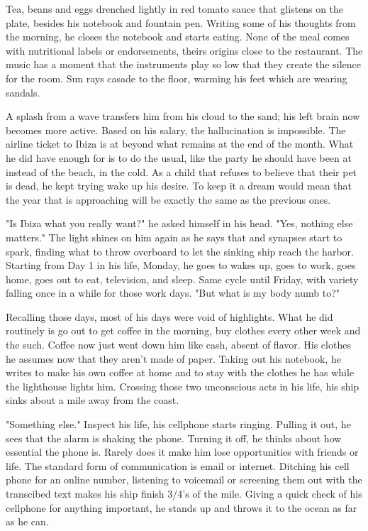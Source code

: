\begin{Document}
        Tea, beans and eggs drenched lightly in red tomato sauce that glistens on the plate, besides his notebook and fountain pen. Writing some of his thoughts
    from the morning, he closes the notebook and starts eating. None of the meal comes with nutritional labels or endorsements, theirs origins close to the 
    restaurant. The music has a moment that the instruments play so low that they create the silence for the room. Sun rays casade to the floor, warming his
    feet which are wearing sandals. 

        A splash from a wave transfers him from his cloud to the sand; his left brain now becomes more active. Based on his salary, the hallucination is
    impossible. The airline ticket to Ibiza is at beyond what remains at the end of the month. What he did have enough for is to do the usual, like the party he
    should have been at instead of the beach, in the cold. As a child that refuses to believe that their pet is dead, he kept trying wake up his desire. To
    keep it a dream would mean that the year that is approaching will be exactly the same as the previous ones.

       "Is Ibiza what you really want?" he asked himself in his head. "Yes, nothing else matters." The light shines on him again as he says that and synapses start
    to spark, finding what to throw overboard to let the sinking ship reach the harbor. Starting from Day 1 in his life, Monday, he goes to wakes up, goes to work,
    goes home, goes out to eat, television, and sleep. Same cycle until Friday, with variety falling once in a while for those work days. "But what is my body
    numb to?"

        Recalling those days, most of his days were void of highlights. What he did routinely is go out to get coffee in the morning, buy clothes every other
    week and the such. Coffee now just went down him like cash, absent of flavor. His clothes he assumes now that they aren't made of paper. Taking out his
    notebook, he writes to make his own coffee at home and to stay with the clothes he has while the lighthouse lights him. Crossing those two unconscious
    acts in his life, his ship sinks about a mile away from the coast.

        "Something else." Inspect his life, his cellphone starts ringing. Pulling it out, he sees that the alarm is shaking the phone. Turning it off, he 
    thinks about how essential the phone is. Rarely does it make him lose opportunities with friends or life. The standard form of communication is email or
    internet. Ditching his cell phone for an online number, listening to voicemail or screening them out with the transcibed text makes his ship finish 3/4's
    of the mile. Giving a quick check of his cellphone for anything important, he stands up and throws it to the ocean as far as he can.
    

\end{Document}
